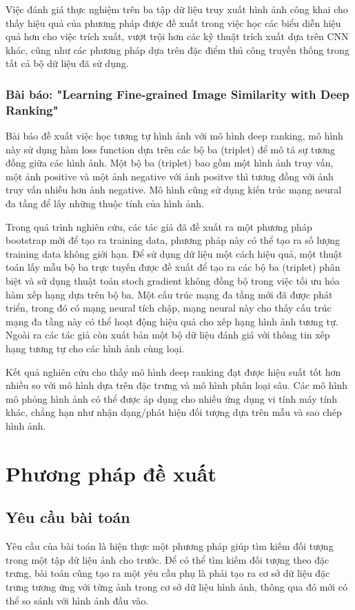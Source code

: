 \documentclass[a4paper,14pt]{extreport}
\begin{document}
Việc đánh giá thực nghiệm trên ba tập dữ liệu truy xuất hình ảnh công khai cho thấy hiệu quả của phương pháp được đề xuất trong việc học các biểu diễn hiệu quả hơn cho việc trích xuất, vượt trội hơn các kỹ thuật trích xuất dựa trên CNN khác, cũng như các phương pháp dựa trên đặc điểm thủ công truyền thống trong tất cả bộ dữ liệu đã sử dụng.

\subsection{Bài báo: "Learning Fine-grained Image Similarity with Deep Ranking" \cite{paper-5}}

Bài báo đề xuất việc học tương tự hình ảnh với mô hình deep ranking, mô hình này sử dụng hàm loss function dựa trên các bộ ba (triplet) để mô tả sự tương đồng giữa các hình ảnh. Một bộ ba (triplet) bao gồm một hình ảnh truy vấn, một ảnh positive và một ảnh negative với ảnh positve thì tương đồng với ảnh truy vấn nhiều hơn ảnh negative. Mô hình cũng sử dụng kiến trúc mạng neural đa tầng để lấy những thuộc tính của hình ảnh. 

Trong quá trình nghiên cứu, các tác giả đã đề xuất ra một phương pháp bootstrap mới để tạo ra training data, phương pháp này có thể tạo ra số lượng training data không giới hạn. Để sử dụng dữ liệu một cách hiệu quả, một thuật toán lấy mẫu bộ ba trực tuyến được đề xuất để tạo ra các bộ ba (triplet) phân biệt và sử dụng thuật toán stoch gradient không đồng bộ trong việc tối ưu hóa hàm xếp hạng dựa trên bộ ba. Một cấu trúc mạng đa tầng mới đã được phát triển, trong đó có mạng neural tích chập, mạng neural này cho thấy cấu trúc mạng đa tầng này có thể hoạt động hiệu quả cho xếp hạng hình ảnh tương tự. Ngoài ra các tác giả còn xuất bản một bộ dữ liệu đánh giá với thông tin  xếp hạng tương tự cho các hình ảnh cùng loại.

Kết quả nghiên cứu cho thấy mô hình deep ranking đạt được hiệu suất tốt hơn nhiều so với mô hình dựa trên đặc trưng và mô hình phân loại sâu. Các mô hình mô phỏng hình ảnh có thể được áp dụng cho nhiều ứng dụng vi tính máy tính khác, chẳng hạn như nhận dạng/phát hiện đối tượng dựa trên mẫu và sao chép hình ảnh.


\chapter{Phương pháp đề xuất}
\section{Yêu cầu bài toán}
Yêu cầu của bài toán là hiện thực một phương pháp giúp tìm kiếm đối tượng trong một tập dữ liệu ảnh cho trước. 
Để có thể tìm kiếm đối tượng theo đặc trưng, bài toán cũng tạo ra một yêu cầu phụ là phải tạo ra cơ sở 
dữ liệu đặc trưng tương ứng với từng ảnh trong cơ sở dữ liệu hình ảnh, thông qua đó mới có thể so sánh 
với hình ảnh đầu vào.
\end{document}
